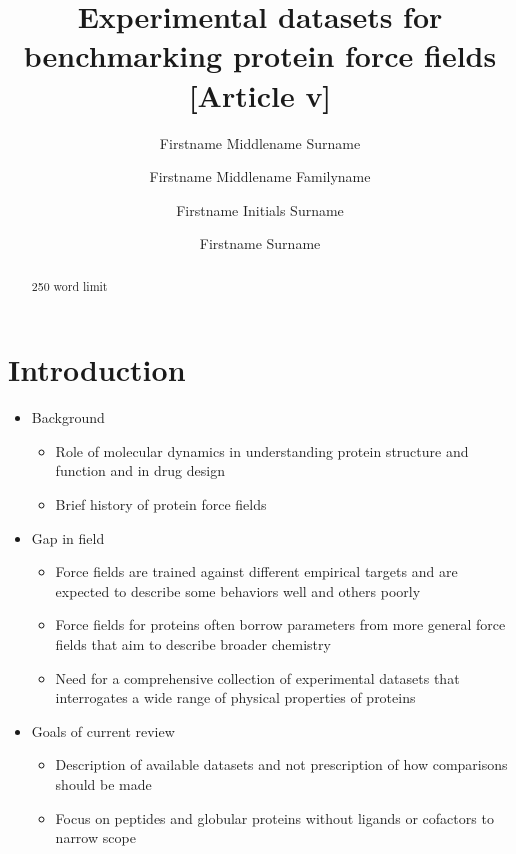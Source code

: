 \documentclass[9pt,review]{livecoms}
\title{Experimental datasets for benchmarking protein force fields [Article v\versionnumber]}
\author[1*]{Firstname Middlename Surname}
\author[1,2\authfn{1}\authfn{3}]{Firstname Middlename Familyname}
\author[2\authfn{1}\authfn{4}]{Firstname Initials Surname}
\author[2*]{Firstname Surname}
\affil[1]{Institution 1}
\affil[2]{Institution 2}
\begin{document}
\begin{frontmatter}
\maketitle

\begin{abstract}
250 word limit
\end{abstract}

\end{frontmatter}

\section{Introduction}

\begin{itemize}

\item Background

	\begin{itemize}
	\item Role of molecular dynamics in understanding protein structure and function and in drug design
	\item Brief history of protein force fields
	\end{itemize}

\item Gap in field

	\begin{itemize}
	\item Force fields are trained against different empirical targets and are expected to describe some behaviors well and others poorly
	\item Force fields for proteins often borrow parameters from more general force fields that aim to describe broader chemistry
	\item Need for a comprehensive collection of experimental datasets that interrogates a wide range of physical properties of proteins
	\end{itemize}

\item Goals of current review

	\begin{itemize}
	\item Description of available datasets and not prescription of how comparisons should be made
	\item Focus on peptides and globular proteins without ligands or cofactors to narrow scope
	\end{itemize}


\end{itemize}
\end{document}

